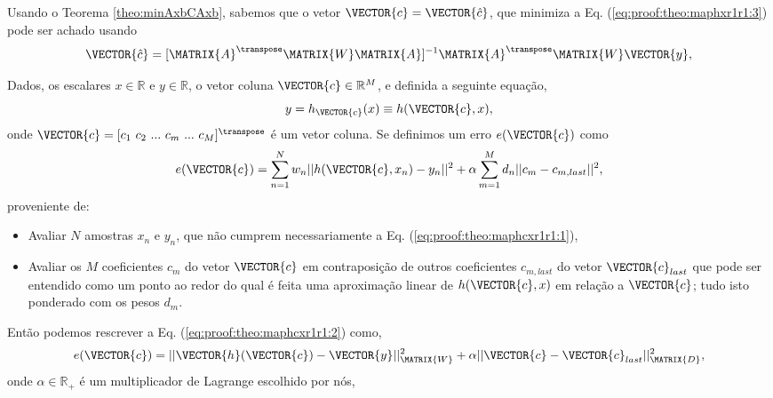 \begin{myproofT}
Usando o Teorema \ref{theo:minAxbCAxb}, sabemos que o vetor $\VECTOR{c}=\VECTOR{\hat{c}}$,
que minimiza a Eq. (\ref{eq:proof:theo:maphxr1r1:3}) pode ser achado usando 
\begin{equation}\label{eq:proof:theo:maphxr1r1:5}
\VECTOR{\hat{c}}=[\MATRIX{A}^{\transpose}\MATRIX{W}\MATRIX{A}]^{-1}\MATRIX{A}^{\transpose}\MATRIX{W}\VECTOR{y},
\end{equation}
\end{myproofT}

\begin{myproofT}\label{proof:theo:maphcxr1r1}
Dados,
os escalares $x \in \mathbb{R}$ e $y \in \mathbb{R}$, o vetor coluna $\VECTOR{c} \in \mathbb{R}^M$, e 
definida a seguinte equação,
\begin{equation}\label{eq:proof:theo:maphcxr1r1:1}
y=h_{\VECTOR{c}}(x)\equiv h(\VECTOR{c},x),
\end{equation}
onde $\VECTOR{c}=[c_1~ c_2~ ...~ c_m~ ...~ c_M]^{\transpose}$ é um vetor coluna.
Se definimos um erro $e(\VECTOR{c})$ como
\begin{equation}\label{eq:proof:theo:maphcxr1r1:2}
e(\VECTOR{c}) =  \sum_{n=1}^{N} w_n||h(\VECTOR{c},x_n)-y_n||^2 + \alpha \sum_{m=1}^{M} d_n||c_m-c_{m,last}||^2,
\end{equation}
proveniente de:
\begin{itemize}
\item Avaliar $N$ amostras $x_n$ e $y_n$, que não cumprem necessariamente a Eq. (\ref{eq:proof:theo:maphcxr1r1:1}), 
\item Avaliar os $M$ coeficientes $c_m$ do vetor $\VECTOR{c}$ 
em contraposição de outros coeficientes $c_{m,last}$ do vetor $\VECTOR{c}_{last}$
que pode ser entendido como um ponto ao redor do qual é feita uma aproximação
linear de $h(\VECTOR{c},x)$ em relação a $\VECTOR{c}$; 
tudo isto ponderado com os pesos $d_m$.
\end{itemize}
Então podemos rescrever a Eq. (\ref{eq:proof:theo:maphcxr1r1:2}) como,
\begin{equation}\label{eq:proof:theo:maphcxr1r1:3}
e(\VECTOR{c}) =  ||\VECTOR{h}(\VECTOR{c})-\VECTOR{y}||_{\MATRIX{W}}^2 + \alpha||\VECTOR{c}-\VECTOR{c}_{last}||_{\MATRIX{D}}^2,
\end{equation}
onde $\alpha \in \mathbb{R}_+$ é um multiplicador de Lagrange escolhido por nós,

\end{myproofT}
